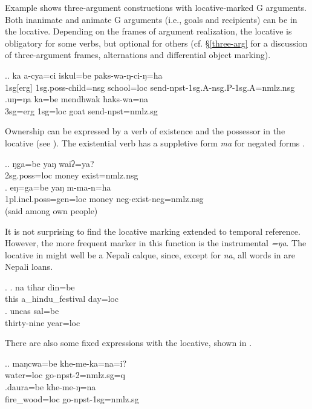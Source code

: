 Example \Next shows three-argument constructions with locative-marked G arguments. Both inanimate and animate G arguments  (i.e., goals and recipients) can be in the locative. Depending on the frames of argument realization, the locative is obligatory for some verbs, but optional for others (cf. §\ref{three-arg} for a discussion of three-argument frames, alternations and differential object marking).
 
\ex.\ag. ka a-cya=ci iskul=be paks-wa-ŋ-ci-ŋ=ha \\
	{\sc 1sg[erg]} {\sc 1sg.poss}-child{\sc =nsg} school{\sc =loc} send-{\sc npst-1sg.A-nsg.P-1sg.A=nmlz.nsg}	\\
	\bg.uŋ=ŋa ka=be mendhwak haks-wa=na\\
	{\sc 3sg=erg} {\sc 1sg=loc} goat send{\sc [3sg.A;3.P]-npst=nmlz.sg}\\

Ownership can be expressed by a verb of existence and the possessor in the locative (see \Next). The existential verb has a suppletive form \emph{ma} for negated forms \Next[b]. 

\ex.\ag. ŋga=be yaŋ waiʔ=ya?\\
{\sc 2sg.poss=loc} money exist{\sc [3sg;npst]=nmlz.nsg}\\
\bg. eŋ=ga=be yaŋ m-ma-n=ha\\
		{\sc 1pl.incl.poss=gen=loc} money {\sc neg-}exist{\sc [3;npst]-neg=nmlz.nsg}	\\
	 (said among own people)

It is not surprising to find the locative marking extended to temporal reference. However, the more frequent marker in this function is the instrumental \emph{=ŋa}. The locative in \Next might well be a Nepali calque, since, except for \emph{na}, all words in \Next are Nepali loans. 

\ex. \ag. na tihar din=be\\
		this a\_hindu\_festival day{\sc =loc}	\\
	 
 	\bg. uncas sal=be\\
	thirty-nine year{\sc =loc}		\\
	 

	There are also some fixed expressions with the locative, shown in \Next.
	
	\ex.\ag. maŋcwa=be  khe-me-ka=na=i?\\
	water{\sc =loc} go{\sc -npst-2=nmlz.sg=q}\\
	 	
	\bg.daura=be khe-me-ŋ=na\\
	fire\_wood{\sc =loc} go{\sc -npst-1sg=nmlz.sg}\\
	
